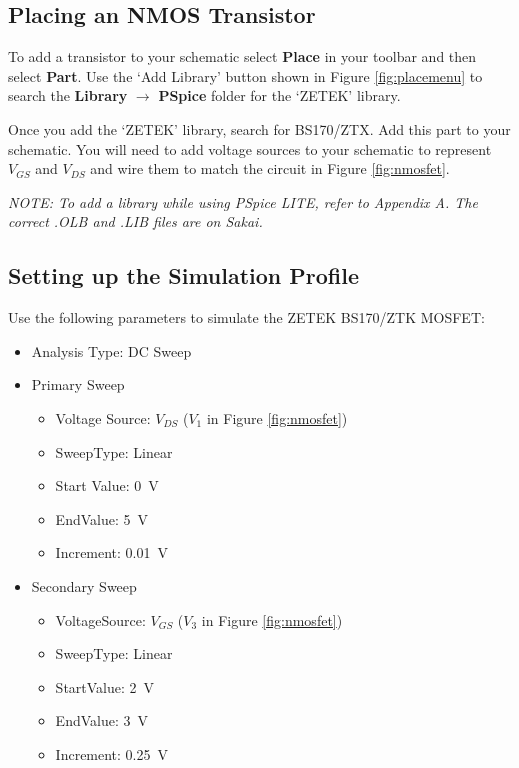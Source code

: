 \documentclass[12pt]{../manual}
\begin{document}
\newpage
\subsection{Placing an NMOS Transistor}
To add a transistor to your schematic select \textbf{Place} in your toolbar and then select \textbf{Part}. Use the `Add Library' button shown in Figure \ref{fig:placemenu} to search the \textbf{Library} $\to$ \textbf{PSpice} folder for the `ZETEK’ library.


Once you add the `ZETEK’ library, search for BS170/ZTX. Add this part to your schematic. You will need to add voltage sources to your schematic to represent $V_{GS}$ and $V_{DS}$ and wire them to match the circuit in Figure \ref{fig:nmosfet}.

\textit{NOTE: To add a library while using PSpice LITE, refer to Appendix A. The correct .OLB and .LIB files are on Sakai.}

\subsection{Setting up the Simulation Profile}
Use the following parameters to simulate the ZETEK BS170/ZTK MOSFET:
\begin{itemize}
\item Analysis Type: DC Sweep
\item Primary Sweep
\begin{itemize}
\item Voltage Source: $V_{DS}$ ($V_1$ in Figure \ref{fig:nmosfet}) 
\item SweepType: Linear
\item Start Value: \SI{0}{\volt}
\item EndValue: \SI{5}{\volt}
\item Increment: \SI{0.01}{\volt} 
\end{itemize}
\item Secondary Sweep
\begin{itemize}
\item VoltageSource: $V_{GS}$ ($V_3$ in Figure \ref{fig:nmosfet}) 
\item SweepType: Linear
\item StartValue: \SI{2}{\volt}
\item EndValue: \SI{3}{\volt}
\item Increment: \SI{0.25}{\volt}
\end{itemize}
\end{itemize}
\end{document}

